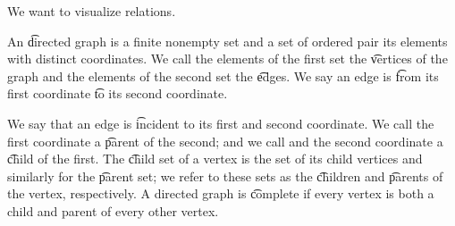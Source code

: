 
\sbasic
























\sstart
{}


We want to visualize relations.


An \t{directed graph} is a finite nonempty set and a set of ordered pair its elements with distinct coordinates.
We call the elements of the first set the \t{vertices} of the graph and the elements of the second set the \t{edges}.
We say an edge is \t{from} its first coordinate \t{to} its second coordinate.

We say that an edge is \t{incident} to its first and second coordinate.
We call the first coordinate a \t{parent} of the second; and we call and the second coordinate a \t{child} of the first.
The \t{child set} of a vertex is the set of its child vertices and similarly for the \t{parent set}; we refer to these sets as the \t{children} and \t{parents} of the vertex, respectively.
A directed graph is \t{complete} if every vertex is both a child and parent of every other vertex.

\strats
